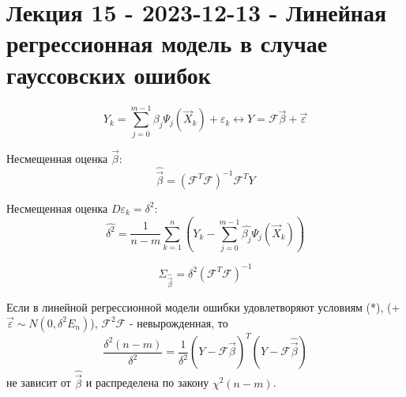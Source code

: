 \section{Лекция 15 - 2023-12-13 - Линейная регрессионная модель в случае гауссовских ошибок}

\[
  Y_k = \sum_{j=0}^{m-1} \beta_j \Psi_j( \vec{X}_k ) + \varepsilon_k
  \leftrightarrow
  Y = \mathcal{F} \vec{\beta} + \vec{\varepsilon}
\]

Несмещенная оценка $\vec{\beta}$:
\[
  \hat{\vec{\beta}} = (\mathcal{F}^T \mathcal{F})^{-1} \mathcal{F}^T Y
\]

Несмещенная оценка $D\varepsilon_k = \delta^2$:
\[
  \hat{\delta^2} = \dfrac{1}{n-m} \sum_{k=1}^n (Y_k - \sum_{j=0}^{m-1} \hat{\beta_j} \Psi_j(\vec{X}_k))
\]

\[
  \Sigma_{\hat{\vec{\beta}}} = \delta^2 (\mathcal{F}^T \mathcal{F})^{-1}
\]

\begin{theorem}
  Если в линейной регрессионной модели ошибки удовлетворяют условиям (*), 
  (+ $\vec{\varepsilon} \sim N(0, \delta^2 E_n)$), $\mathcal{F}^2 \mathcal{F}$ - невырожденная, 
  то 
  \[
    \dfrac{\delta^2 (n-m)}{\delta^2} =
    \dfrac{1}{\delta^2} (Y - \mathcal{F} \hat{\vec{\beta}})^T (Y - \mathcal{F} \hat{\vec{\beta}})
  \]
  не зависит от $\hat{\vec{\beta}}$ и распределена по закону $\chi^2(n-m)$.
\end{theorem}


